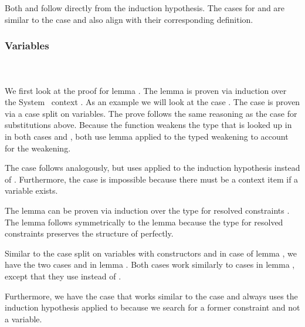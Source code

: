 \noindent Both  and  follow directly from the induction hypothesis. 
The cases for  and  are similar to the case  and also align with their corresponding definition.
\newpage
\subsubsection{Variables}\hfill\\\\
We first look at the proof for lemma . 
The lemma is proven via induction over the System \Fo\ context . 
\DPTVarPresLookup
As an example we will look at the case   . The case is proven via a case split on variables. 
The prove follows the same reasoning as the  case for substitutions above. 
Because the function  weakens the type  that is looked up in  in both cases  and , both use lemma  applied to the typed weakening  to account for the weakening. 

\noindent The case    follows analogously, but uses  applied to the induction hypothesis instead of . Furthermore, the case  is impossible because there must be a context item if a variable exists.

\noindent The lemma  can be proven via induction over the type for resolved constraints \Data{[}  \Data{]∈} . The lemma follows symmetrically to the lemma  because the type for resolved constraints preserves the structure of  perfectly.

\DPTOVarPresLookup
Similar to the case split on variables with constructors  and  in case    of lemma , we have the two cases  and  in lemma . Both cases work similarly to cases in lemma , except that they use  instead of .

\noindent Furthermore, we have the case  that works similar to the case    and always uses the induction hypothesis applied to  because we search for a former constraint and not a variable.